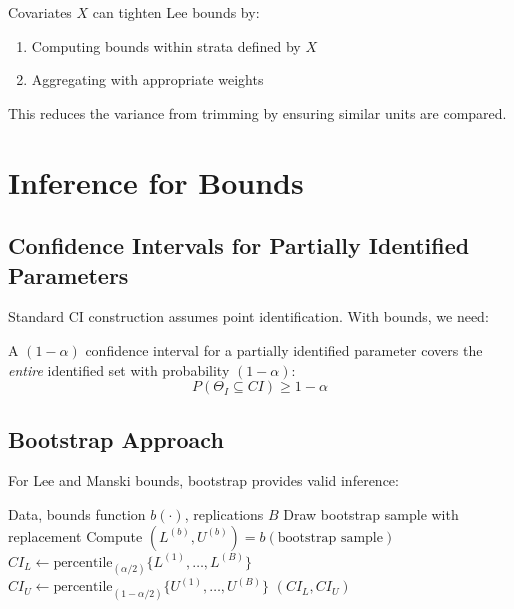 Covariates $X$ can tighten Lee bounds by:
\begin{enumerate}
    \item Computing bounds within strata defined by $X$
    \item Aggregating with appropriate weights
\end{enumerate}

This reduces the variance from trimming by ensuring similar units are compared.


\section{Inference for Bounds}
\label{sec:bounds_inference}

\subsection{Confidence Intervals for Partially Identified Parameters}

Standard CI construction assumes point identification. With bounds, we need:

\begin{definition}
\label{def:ci_bounds}
A $(1-\alpha)$ confidence interval for a partially identified parameter covers the \emph{entire} identified set with probability $(1-\alpha)$:
\[
P(\Theta_I \subseteq CI) \geq 1 - \alpha
\]
\end{definition}

\subsection{Bootstrap Approach}

For Lee and Manski bounds, bootstrap provides valid inference:

\begin{algorithm}[htbp]
\caption{Bootstrap CI for Bounds}
\label{alg:bootstrap_bounds}
\begin{algorithmic}[1]
\REQUIRE Data, bounds function $b(\cdot)$, replications $B$
    \STATE Draw bootstrap sample with replacement
    \STATE Compute $(L^{(b)}, U^{(b)}) = b(\text{bootstrap sample})$
\ENDFOR
\STATE $CI_L \gets \text{percentile}_{(\alpha/2)}\{L^{(1)}, \ldots, L^{(B)}\}$
\STATE $CI_U \gets \text{percentile}_{(1-\alpha/2)}\{U^{(1)}, \ldots, U^{(B)}\}$
\RETURN $(CI_L, CI_U)$
\end{algorithmic}
\end{algorithm}

